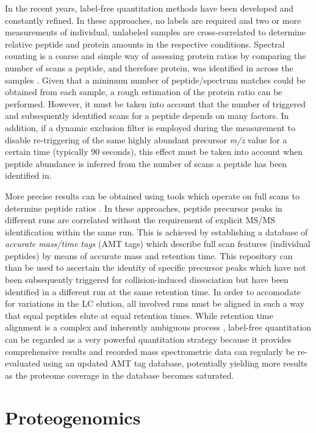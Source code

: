 In the recent years, label-free quantitation methods have been developed and
constantly refined.
In these approaches, no labels are required and two or more measurements of 
individual, unlabeled samples are cross-correlated to determine relative 
peptide and protein amounts in the respective conditions.
Spectral counting is a coarse and simple way of assessing protein ratios by
comparing the number of scans a peptide, and therefore protein, was identified
in across the samples \citep{Old2005}.
Given that a minimum number of peptide/spectrum matches could be obtained from
each sample, a rough estimation of the protein ratio can be performed.
However, it must be taken into account that the number of triggered and
subsequently identified scans for a peptide depends on many factors.
In addition, if a dynamic exclusion filter is employed during the measurement 
to disable re-triggering of the same highly abundant precursor {\em m/z} value 
for a certain time (typically 90 seconds), this effect must be taken into 
account when peptide abundance is inferred from the number of scans a peptide
has been identified in.

More precise results can be obtained using tools which operate on full scans
to determine peptide ratios \citep{Mueller2007, Park2008}.
In these approaches, peptide precursor peaks in different runs are correlated 
without the requirement of explicit MS/MS identification within the same run.
This is achieved by establishing a database of {\em accurate mass/time tags} 
(AMT tags) which describe full scan features (individual peptides) by means
of accurate mass and retention time.
This repository can than be used to ascertain the identity of specific precursor
peaks which have not been subsequently triggered for collision-induced 
dissociation but have been identified in a different run at the same retention 
time.
In order to accomodate for variations in the LC elution, all involved runs
must be aligned in such a way that equal peptides elute at equal retention times.
While retention time alignment is a complex and inherently ambiguous process
\citep{Fischer2006}, label-free quantitation can be regarded as a very powerful
quantitation strategy because it provides comprehensive results and recorded 
mass spectrometric data can regularly be re-evaluated using an updated AMT tag 
database, potentially yielding more results as the proteome coverage in
the database becomes saturated.


\section{Proteogenomics}
\label{proteogenomics}

